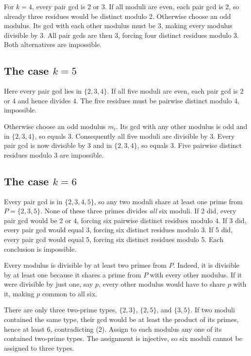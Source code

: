 \documentclass[11pt,a4paper]{article}
\begin{document}
For \(k=4\), every pair gcd is 2 or 3. If all moduli are even, each pair gcd is 2, so already three residues would be distinct modulo 2. Otherwise choose an odd modulus. Its gcd with each other modulus must be 3, making every modulus divisible by 3. All pair gcds are then 3, forcing four distinct residues modulo 3. Both alternatives are impossible.

\subsection{\texorpdfstring{The case \(k=5\)}{The case k=5}}\label{the-case-k5}

Here every pair gcd lies in \(\{2,3,4\}\). If all five moduli are even, each pair gcd is 2 or 4 and hence divides 4. The five residues must be pairwise distinct modulo 4, impossible.

Otherwise choose an odd modulus \(m_i\). Its gcd with any other modulus is odd and in \(\{2,3,4\}\), so equals 3. Consequently all five moduli are divisible by 3. Every pair gcd is now divisible by 3 and in \(\{2,3,4\}\), so equals 3. Five pairwise distinct residues modulo 3 are impossible.

\subsection{\texorpdfstring{The case \(k=6\)}{The case k=6}}\label{the-case-k6}

Every pair gcd is in \(\{2,3,4,5\}\), so any two moduli share at least one prime from \(P=\{2,3,5\}\). None of these three primes divides \emph{all} six moduli. If 2 did, every pair gcd would be 2 or 4, forcing six pairwise distinct residues modulo 4. If 3 did, every pair gcd would equal 3, forcing six distinct residues modulo 3. If 5 did, every pair gcd would equal 5, forcing six distinct residues modulo 5. Each conclusion is impossible.

Every modulus is divisible by at least two primes from \(P\). Indeed, it is divisible by at least one because it shares a prime from \(P\) with every other modulus. If it were divisible by just one, say \(p\), every other modulus would have to share \(p\) with it, making \(p\) common to all six.

There are only three two-prime types, \(\{2,3\}\), \(\{2,5\}\), and \(\{3,5\}\). If two moduli contained the same type, their gcd would be at least the product of its primes, hence at least 6, contradicting (2). Assign to each modulus any one of its contained two-prime types. The assignment is injective, so six moduli cannot be assigned to three types.
\end{document}
